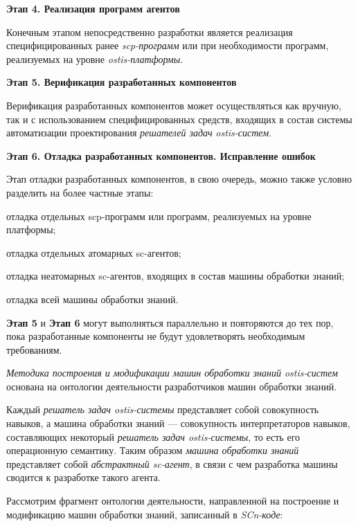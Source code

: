\textbf{Этап 4. Реализация программ агентов}

Конечным этапом непосредственно разработки является реализация специфицированных ранее \textit{scp-программ} или при необходимости программ, реализуемых на уровне \textit{ostis-платформы}.

\textbf{Этап 5. Верификация разработанных компонентов}

Верификация разработанных компонентов может осуществляться как вручную, так и с использованием специфицированных средств, входящих в состав системы автоматизации проектирования \textit{решателей задач} \textit{ostis-систем}.

\textbf{Этап 6. Отладка разработанных компонентов. Исправление ошибок}

Этап отладки разработанных компонентов, в свою очередь, можно также условно разделить на более частные этапы:

\begin{textitemize}
    \item отладка отдельных scp-программ или программ, реализуемых на уровне платформы;
    \item отладка отдельных атомарных sc-агентов;
    \item отладка неатомарных sc-агентов, входящих в состав машины обработки знаний;
    \item отладка всей машины обработки знаний.
\end{textitemize}

\textbf{Этап 5} и \textbf{Этап 6} могут выполняться параллельно и повторяются до тех пор, пока разработанные компоненты не будут удовлетворять необходимым требованиям.

\textit{Методика построения и модификации машин обработки знаний ostis-систем} основана на онтологии деятельности разработчиков машин обработки знаний.

Каждый \textit{решатель задач ostis-системы} представляет собой совокупность навыков, а машина обработки знаний --- совокупность интерпретаторов навыков, составляющих некоторый \textit{решатель задач ostis-системы}, то есть его операционную семантику. Таким образом \textit{машина обработки знаний} представляет собой \textit{абстрактный sc-агент}, в связи с чем разработка машины сводится к разработке такого агента.

Рассмотрим фрагмент онтологии деятельности, направленной на построение и модификацию машин обработки знаний, записанный в \textit{SCn-коде}:

